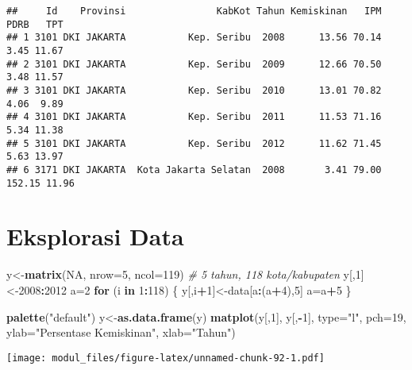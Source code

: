 \documentclass[
]{book}
\newenvironment{Shaded}{\begin{snugshade}}{\end{snugshade}}
\newcommand{\CommentTok}[1]{\textcolor[rgb]{0.56,0.35,0.01}{\textit{#1}}}
\newcommand{\ControlFlowTok}[1]{\textcolor[rgb]{0.13,0.29,0.53}{\textbf{#1}}}
\newcommand{\DataTypeTok}[1]{\textcolor[rgb]{0.13,0.29,0.53}{#1}}
\newcommand{\DecValTok}[1]{\textcolor[rgb]{0.00,0.00,0.81}{#1}}
\newcommand{\KeywordTok}[1]{\textcolor[rgb]{0.13,0.29,0.53}{\textbf{#1}}}
\newcommand{\NormalTok}[1]{#1}
\newcommand{\OperatorTok}[1]{\textcolor[rgb]{0.81,0.36,0.00}{\textbf{#1}}}
\newcommand{\OtherTok}[1]{\textcolor[rgb]{0.56,0.35,0.01}{#1}}
\newcommand{\StringTok}[1]{\textcolor[rgb]{0.31,0.60,0.02}{#1}}
\begin{document}
\begin{verbatim}
##     Id    Provinsi                KabKot Tahun Kemiskinan   IPM   PDRB   TPT
## 1 3101 DKI JAKARTA           Kep. Seribu  2008      13.56 70.14   3.45 11.67
## 2 3101 DKI JAKARTA           Kep. Seribu  2009      12.66 70.50   3.48 11.57
## 3 3101 DKI JAKARTA           Kep. Seribu  2010      13.01 70.82   4.06  9.89
## 4 3101 DKI JAKARTA           Kep. Seribu  2011      11.53 71.16   5.34 11.38
## 5 3101 DKI JAKARTA           Kep. Seribu  2012      11.62 71.45   5.63 13.97
## 6 3171 DKI JAKARTA  Kota Jakarta Selatan  2008       3.41 79.00 152.15 11.96
\end{verbatim}

\hypertarget{eksplorasi-data-2}{%
\section{Eksplorasi Data}\label{eksplorasi-data-2}}

\begin{Shaded}
\begin{Highlighting}[]
\NormalTok{y\textless{}{-}}\KeywordTok{matrix}\NormalTok{(}\OtherTok{NA}\NormalTok{, }\DataTypeTok{nrow=}\DecValTok{5}\NormalTok{, }\DataTypeTok{ncol=}\DecValTok{119}\NormalTok{) }\CommentTok{\# 5 tahun, 118 kota/kabupaten}
\NormalTok{y[,}\DecValTok{1}\NormalTok{]\textless{}{-}}\DecValTok{2008}\OperatorTok{:}\DecValTok{2012}
\NormalTok{a=}\DecValTok{2}
\ControlFlowTok{for}\NormalTok{ (i }\ControlFlowTok{in} \DecValTok{1}\OperatorTok{:}\DecValTok{118}\NormalTok{)}
\NormalTok{\{}
\NormalTok{  y[,i}\OperatorTok{+}\DecValTok{1}\NormalTok{]\textless{}{-}data[a}\OperatorTok{:}\NormalTok{(a}\OperatorTok{+}\DecValTok{4}\NormalTok{),}\DecValTok{5}\NormalTok{]}
\NormalTok{  a=a}\OperatorTok{+}\DecValTok{5}
\NormalTok{\}}

\KeywordTok{palette}\NormalTok{(}\StringTok{"default"}\NormalTok{)}
\NormalTok{y\textless{}{-}}\KeywordTok{as.data.frame}\NormalTok{(y)}
\KeywordTok{matplot}\NormalTok{(y[,}\DecValTok{1}\NormalTok{], y[,}\OperatorTok{{-}}\DecValTok{1}\NormalTok{], }\DataTypeTok{type=}\StringTok{"l"}\NormalTok{, }\DataTypeTok{pch=}\DecValTok{19}\NormalTok{, }\DataTypeTok{ylab=}\StringTok{"Persentase Kemiskinan"}\NormalTok{, }\DataTypeTok{xlab=}\StringTok{"Tahun"}\NormalTok{)}
\end{Highlighting}
\end{Shaded}

\texttt{[image: modul\_files/figure-latex/unnamed-chunk-92-1.pdf]}
\end{document}
